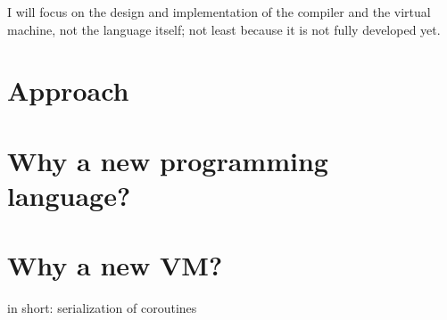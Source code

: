 	I will focus on the design and implementation of the compiler and the virtual machine, not the language itself; not least because it is not fully developed yet.
    
    
	\section{Approach} %
	
	
	\section{Why a new programming language?}
	
	\section{Why a new VM?}
	
	in short: serialization of coroutines
